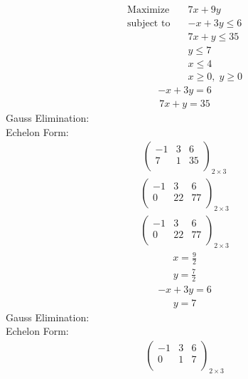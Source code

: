 \documentclass{article}
\begin{document}
\begin{align*}
\text{Maximize} \quad & 7x + 9y\\
\text{subject to} \quad
& -x + 3y\le6\\
& 7x + y\le35\\
& y\le7\\
& x\le4\\
& x\ge0,\; y\ge0\end{align*}
\begin{align*}
-x + 3y=6\end{align*}
\begin{align*}
7x + y=35\end{align*}
Gauss Elimination:\\
Echelon Form:\\
\begin{align*}
\left(
\begin{array}{cc|c}
-1 & 3 & 6\\
7 & 1 & 35\\
\end{array}
\right)_{2\times 3}
\end{align*}
\begin{align*}
\left(
\begin{array}{cc|c}
-1 & 3 & 6\\
0 & 22 & 77\\
\end{array}
\right)_{2\times 3}
\end{align*}
\begin{align*}
\left(
\begin{array}{cc|c}
-1 & 3 & 6\\
0 & 22 & 77\\
\end{array}
\right)_{2\times 3}
\end{align*}
\begin{align*}
x=\frac{9}{2}\end{align*}
\begin{align*}
y=\frac{7}{2}\end{align*}
\begin{align*}
-x + 3y=6\end{align*}
\begin{align*}
y=7\end{align*}
Gauss Elimination:\\
Echelon Form:\\
\begin{align*}
\left(
\begin{array}{cc|c}
-1 & 3 & 6\\
0 & 1 & 7\\
\end{array}
\right)_{2\times 3}
\end{align*}
\end{document}
